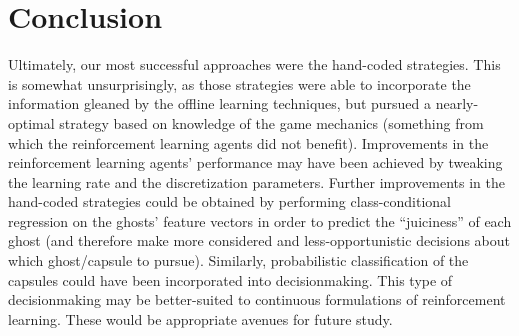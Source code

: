 \documentclass[11pt]{amsart}
\begin{document}
\section{Conclusion}

Ultimately, our most successful approaches were the hand-coded strategies. This is somewhat unsurprisingly, as those strategies were able to incorporate the information gleaned by the offline learning techniques, but pursued a nearly-optimal strategy based on knowledge of the game mechanics (something from which the reinforcement learning agents did not benefit). Improvements in the reinforcement learning agents' performance may have been achieved by tweaking the learning rate and the discretization parameters. Further improvements in the hand-coded strategies could be obtained by performing class-conditional regression on the ghosts' feature vectors in order to predict the ``juiciness'' of each ghost (and therefore make more considered and less-opportunistic decisions about which ghost/capsule to pursue). Similarly, probabilistic classification of the capsules could have been incorporated into decisionmaking. This type of decisionmaking may be better-suited to continuous formulations of reinforcement learning. These would be appropriate avenues for future study.
\end{document}
